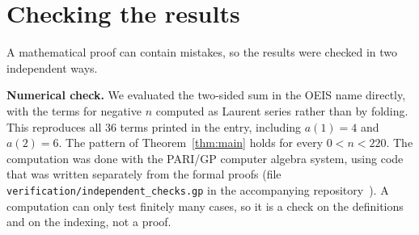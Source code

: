 \documentclass[11pt,a4paper]{article}
\theoremstyle{definition}
\theoremstyle{remark}
\newcommand{\para}[1]{\par\medskip\noindent\textbf{#1}\enspace}
\begin{document}
\section{Checking the results}\label{sec:checks}

A mathematical proof can contain mistakes, so the results were checked in two independent ways.

\para{Numerical check.}
We evaluated the two-sided sum in the OEIS name directly, with the terms for negative $n$ computed as Laurent
series rather than by folding. This reproduces all 36 terms printed in the entry, including $a(1)=4$ and $a(2)=6$. The
pattern of Theorem~\ref{thm:main} holds for every $0<n<220$.
The computation was done with the PARI/GP computer algebra system, using code that was written separately from the
formal proofs (file \texttt{verification/independent\_checks.gp} in the accompanying repository~\cite{repo}).
A computation can only test finitely many cases, so it is a check on the definitions and on the indexing, not a proof.
\end{document}
